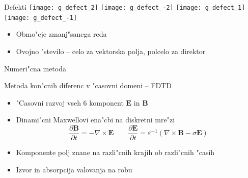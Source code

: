\documentclass{beamer}
\newcommand{\odvod}[2]{\frac{\partial #1}{\partial #2}}
\renewcommand{\vec}{\mathbf}
\newcommand{\eps}{\varepsilon}
\begin{document}
\begin{frame}{Defekti}
 \texttt{[image: g\_defect\_2]}
 \texttt{[image: g\_defect\_-2]}
 \texttt{[image: g\_defect\_1]}
 \texttt{[image: g\_defect\_-1]}

 \begin{itemize}
  \item Obmo"cje zmanj"sanega reda
  \item Ovojno "stevilo -- celo za vektorska polja, polcelo za direktor
 \end{itemize}
 
\end{frame}


\begin{frame}{Numeri"cna metoda}
 \begin{block}{Metoda kon"cnih diferenc v "casovni domeni -- FDTD}
  \begin{itemize}
   \item "Casovni razvoj vseh 6 komponent $\vec E$ in $\vec B$
   \item Dinami"cni Maxwellovi ena"cbi na diskretni mre"zi
   \begin{equation*}
     \odvod{\vec{B}}{t} = -\nabla \times \vec{E} \qquad \odvod{\vec{E}}{t} = \eps^{-1} (\nabla \times \vec{B} - \sigma \vec E)
   \end{equation*}
    \item Komponente polj znane na razli"cnih krajih ob razli"cnih "casih
    \item Izvor in absorpcija valovanja na robu
  \end{itemize}
 \end{block}
\end{frame}
\end{document}
